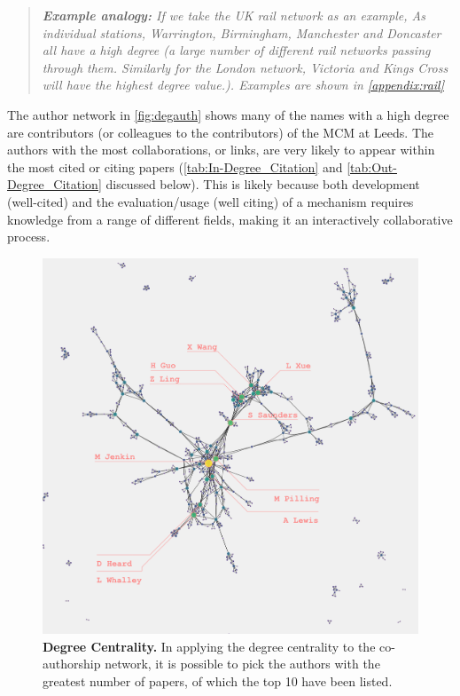 \begin{quote}
\textit{
\textbf{Example analogy:} If we take the UK rail network as an example, As individual stations, Warrington, Birmingham, Manchester and Doncaster all have a high degree (a large number of different rail networks passing through them. Similarly for the London network, Victoria and Kings Cross will have the highest degree value.). Examples are shown in \autoref{appendix:rail}
}
\end{quote}

The author network in \autoref{fig:degauth} shows many of the names with a high degree are contributors (or colleagues to the contributors) of the MCM at Leeds. The authors with the most collaborations, or links, are very likely to appear within the most cited or citing papers (\autoref{tab:In-Degree_Citation} and \autoref{tab:Out-Degree_Citation} discussed below). This is likely because both development (well-cited) and the evaluation/usage (well citing) of a mechanism requires knowledge from a range of different fields, making it an interactively collaborative process.

\begin{figure}[H]
     \centering
         \includegraphics[width=.8\textwidth]{figures_c3/degreeauthor.png}
         
        \caption{ \textbf{Degree Centrality.} In applying the degree centrality to the co-authorship network, it is possible to pick the authors with the greatest number of papers, of which the top 10 have been listed.}
        \label{fig:degauth}
\end{figure}

